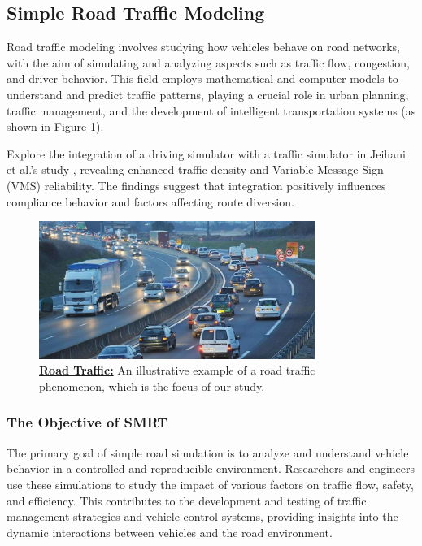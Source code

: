 \documentclass{article}
\begin{document}
	\subsection{Simple Road Traffic Modeling}
	
		Road traffic modeling involves studying how vehicles behave on road networks, with the aim of simulating and analyzing aspects such as traffic flow, congestion, and driver behavior. This field employs mathematical and computer models to understand and predict traffic patterns, playing a crucial role in urban planning, traffic management, and the development of intelligent transportation systems (as shown in Figure \ref{fig:intro}). 
		
		Explore the integration of a driving simulator with a traffic simulator in Jeihani et al.'s study \cite{JEIHANI2017164}, revealing enhanced traffic density and Variable Message Sign (VMS) reliability. The findings suggest that integration positively influences compliance behavior and factors affecting route diversion.
		
		\cite{SMRT}
		\begin{figure}[H]
			\centering
			\includegraphics[width=0.8\textwidth]{intro.jpg}
			\caption[Road Traffic]{\textbf{\underline{Road Traffic:}} An illustrative example of a road traffic phenomenon, which is the focus of our study.}
			\label{fig:intro}
		\end{figure}
	
		
		\subsubsection{The Objective of SMRT}
		The primary goal of simple road simulation is to analyze and understand vehicle behavior in a controlled and reproducible environment. Researchers and engineers use these simulations to study the impact of various factors on traffic flow, safety, and efficiency. This contributes to the development and testing of traffic management strategies and vehicle control systems, providing insights into the dynamic interactions between vehicles and the road environment.
		
\end{document}
